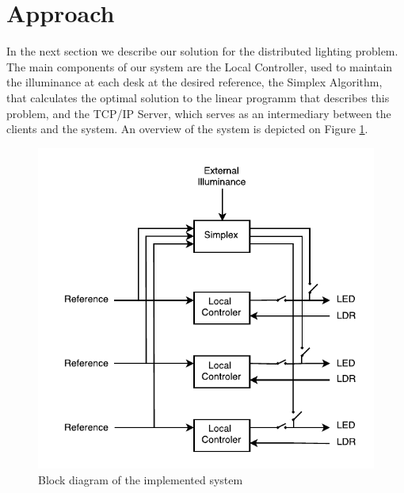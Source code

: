 \section{Approach}

In the next section we describe our solution for the distributed lighting problem. The main components of our system are the Local Controller, used to maintain the illuminance at each desk at the desired reference, the Simplex Algorithm, that calculates the optimal solution to the linear programm that describes this problem, and the TCP/IP Server, which serves as an intermediary between the clients and the system. An overview of the system is depicted on Figure \ref{fig:global_system}.

\begin{figure}[!ht]
    \centering
        \includegraphics[scale=0.8]{img/GlobalSystem}
    \caption{Block diagram of the implemented system}\label{fig:global_system}
\end{figure}







